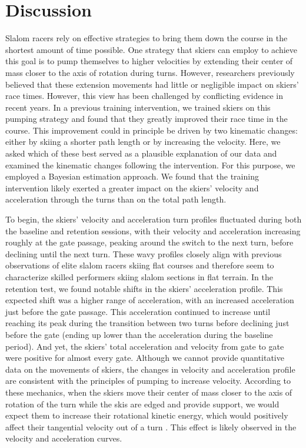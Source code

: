 \documentclass{article}
\begin{document}
\section{Discussion}

Slalom racers rely on effective strategies to bring them down the course in the shortest amount of time possible. One strategy that skiers can employ to achieve this goal is to pump themselves to higher velocities by extending their center of mass closer to the axis of rotation during turns. However, researchers previously believed that these extension movements had little or negligible impact on skiers' race times. However, this view has been challenged by conflicting evidence in recent years. In a previous training intervention, we trained skiers on this pumping strategy and found that they greatly improved their race time in the course. This improvement could in principle be driven by two kinematic changes: either by skiing a shorter path length or by increasing the velocity. Here, we asked which of these best served as a plausible explanation of our data and examined the kinematic changes following the intervention. For this purpose, we employed a Bayesian estimation approach. We found that the training intervention likely exerted a greater impact on the skiers' velocity and acceleration through the turns than on the total path length.

To begin, the skiers' velocity and acceleration turn profiles fluctuated during both the baseline and retention sessions, with their velocity and acceleration increasing roughly at the gate passage, peaking around the switch to the next turn, before declining until the next turn. These wavy profiles closely align with previous observations of elite slalom racers skiing flat courses \cite{supej_impact_2015} and therefore seem to characterize skilled performers skiing slalom sections in flat terrain. In the retention test, we found notable shifts in the skiers' acceleration profile. This expected shift was a higher range of acceleration, with an increased acceleration just before the gate passage. This acceleration continued to increase until reaching its peak during the transition between two turns before declining just before the gate (ending up lower than the acceleration during the baseline period). And yet, the skiers' total acceleration and velocity from gate to gate were positive for almost every gate. Although we cannot provide quantitative data on the movements of skiers, the changes in velocity and acceleration profile are consistent with the principles of pumping to increase velocity. According to these mechanics, when the skiers move their center of mass closer to the axis of rotation of the turn while the skis are edged and provide support, we would expect them to increase their rotational kinetic energy, which would positively affect their tangential velocity out of a turn \cite{lind_physics_2013}. This effect is likely observed in the velocity and acceleration curves.
\end{document}
